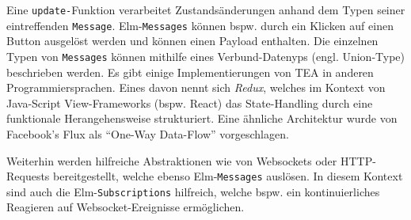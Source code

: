 Eine \texttt{update-}Funktion verarbeitet Zustandsänderungen anhand dem Typen seiner eintreffenden \texttt{Message}.
Elm-\texttt{Messages} können \ac{bspw.} durch ein Klicken auf einen Button ausgelöst werden und können einen Payload enthalten.
Die einzelnen Typen von \texttt{Messages} können mithilfe eines Verbund-Datenyps (engl. Union-Type) beschrieben werden.
Es gibt einige Implementierungen von TEA in anderen Programmiersprachen.
Eines davon nennt sich \textit{Redux}, welches im Kontext von Java-Script View-Frameworks (\ac{bspw.} React) das State-Handling durch eine funktionale Herangehensweise strukturiert.
Eine ähnliche Architektur wurde von Facebook's Flux als "`One-Way Data-Flow"' vorgeschlagen.
\par
Weiterhin werden hilfreiche Abstraktionen wie von Websockets oder HTTP-Requests bereitgestellt, welche ebenso Elm-\texttt{Messages} auslösen.
In diesem Kontext sind auch die Elm-\texttt{Subscriptions} hilfreich, welche \ac{bspw.} ein kontinuierliches Reagieren auf Websocket-Ereignisse ermöglichen.

